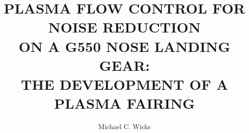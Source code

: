 \documentclass[final,numrefs,sort&compress]{nddiss2e}
\begin{document}
\frontmatter %

\title{PLASMA FLOW CONTROL FOR NOISE REDUCTION \\ ON A G550 NOSE LANDING GEAR: \\ THE DEVELOPMENT OF A PLASMA FAIRING}
\author{Michael C. Wicks}

\maketitle
%
%

\makecopyright
\end{document}
